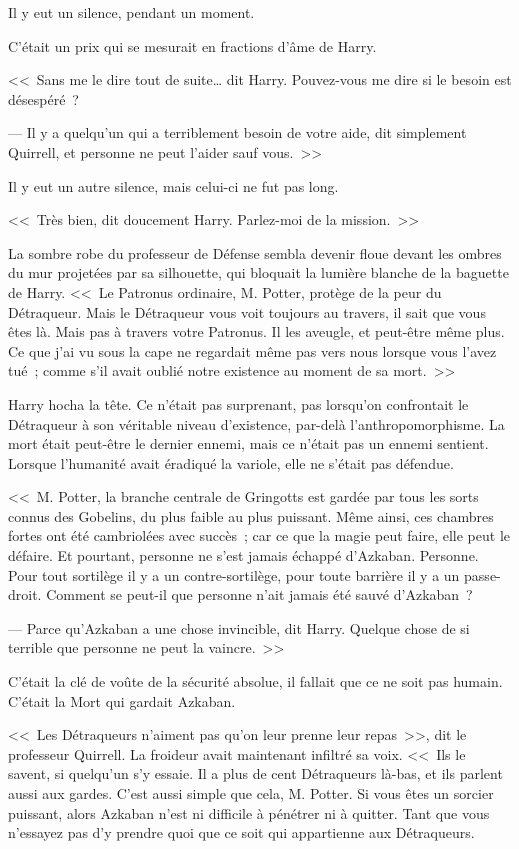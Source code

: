 Il y eut un silence, pendant un moment.

C'était un prix qui se mesurait en fractions d'âme de Harry.

<<~Sans me le dire tout de suite… dit Harry. Pouvez-vous me dire si le besoin est désespéré~?

--- Il y a quelqu'un qui a terriblement besoin de votre aide, dit simplement Quirrell, et personne ne peut l'aider sauf vous.~>>

Il y eut un autre silence, mais celui-ci ne fut pas long.

<<~Très bien, dit doucement Harry. Parlez-moi de la mission.~>>

La sombre robe du professeur de Défense sembla devenir floue devant les ombres du mur projetées par sa silhouette, qui bloquait la lumière blanche de la baguette de Harry. <<~Le Patronus ordinaire, M. Potter, protège de la peur du Détraqueur. Mais le Détraqueur vous voit toujours au travers, il sait que vous êtes là. Mais pas à travers votre Patronus. Il les aveugle, et peut-être même plus. Ce que j'ai vu sous la cape ne regardait même pas vers nous lorsque vous l'avez tué~; comme s'il avait oublié notre existence au moment de sa mort.~>>

Harry hocha la tête. Ce n'était pas surprenant, pas lorsqu'on confrontait le Détraqueur à son véritable niveau d'existence, par-delà l'anthropomorphisme. La mort était peut-être le dernier ennemi, mais ce n'était pas un ennemi sentient. Lorsque l'humanité avait éradiqué la variole, elle ne s'était pas défendue.

<<~M. Potter, la branche centrale de Gringotts est gardée par tous les sorts connus des Gobelins, du plus faible au plus puissant. Même ainsi, ces chambres fortes ont été cambriolées avec succès~; car ce que la magie peut faire, elle peut le défaire. Et pourtant, personne ne s'est jamais échappé d'Azkaban. Personne. Pour tout sortilège il y a un contre-sortilège, pour toute barrière il y a un passe-droit. Comment se peut-il que personne n'ait jamais été sauvé d'Azkaban~?

--- Parce qu'Azkaban a une chose invincible, dit Harry. Quelque chose de si terrible que personne ne peut la vaincre.~>>

C'était la clé de voûte de la sécurité absolue, il fallait que ce ne soit pas humain. C'était la Mort qui gardait Azkaban.

<<~Les Détraqueurs n'aiment pas qu'on leur prenne leur repas~>>, dit le professeur Quirrell. La froideur avait maintenant infiltré sa voix. <<~Ils le savent, si quelqu'un s'y essaie. Il a plus de cent Détraqueurs là-bas, et ils parlent aussi aux gardes. C'est aussi simple que cela, M. Potter. Si vous êtes un sorcier puissant, alors Azkaban n'est ni difficile à pénétrer ni à quitter. Tant que vous n'essayez pas d'y prendre quoi que ce soit qui appartienne aux Détraqueurs.

